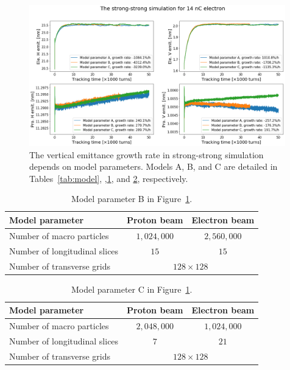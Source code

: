 \documentclass{article}
\begin{document}
\begin{figure}
    \centering
    \includegraphics[width=0.99\textwidth]{pic/compareModel.png}
    \caption{The vertical emittance growth rate in strong-strong simulation depends on model parameters. Models A, B, and C are detailed in Tables~\ref{tab:model},
,\ref{tab:modelB}, and \ref{tab:modelC}, respectively.}
    \label{fig:compareModel}
\end{figure}

\begin{table}
    \centering
    \caption{Model parameter B in Figure~\ref{fig:compareModel}.\\}
    \begin{tabular}{lcc}
    \toprule
    Model parameter & Proton beam & Electron beam\\
    \midrule
    Number of macro particles & $1,024,000$ & $2,560,000$\\
    Number of longitudinal slices & $15$ & $15$\\
    Number of transverse grids & \multicolumn{2}{c}{$128\times 128$}\\
    \bottomrule
    \end{tabular}
    \label{tab:modelB}
\end{table}

\begin{table}
    \centering
    \caption{Model parameter C in Figure~\ref{fig:compareModel}.\\}
    \begin{tabular}{lcc}
    \toprule
    Model parameter & Proton beam & Electron beam\\
    \midrule
    Number of macro particles & $2,048,000$ & $1,024,000$\\
    Number of longitudinal slices & $7$ & $21$\\
    Number of transverse grids & \multicolumn{2}{c}{$128\times 128$}\\
    \bottomrule
    \end{tabular}
    \label{tab:modelC}
\end{table}
\end{document}
